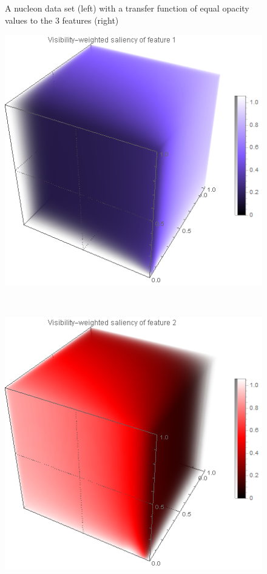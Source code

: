 \begin{figure}
\begin{minipage}{.2\textwidth}
	\end{minipage}
	\caption{A nucleon data set \cite{website:Voreen_datasets_2013} (left) with a transfer function of equal opacity values to the 3 features (right)}
	\label{fig:nucleon_naive}
\end{figure}

\begin{figure}
	\centering
	\begin{minipage}{.3\textwidth}
		\includegraphics[width=1\linewidth]{images/nucleon_strong_red_densityplot1}	
	\end{minipage}~
	\begin{minipage}{.3\textwidth}
		\includegraphics[width=1\linewidth]{images/nucleon_strong_red_densityplot2}	

\end{minipage}
\end{figure}
